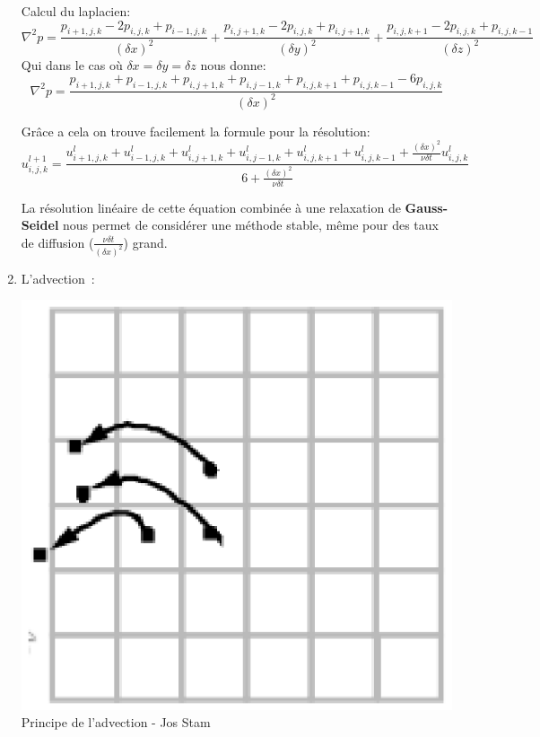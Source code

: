 \documentclass[a4paper,10pt]{article}
\begin{document}
\begin{enumerate}
  Calcul du laplacien:
  \begin{equation}
    {\nabla^2}p = \frac{p_{i+1,j,k} - 2p_{i,j,k} + p_{i-1,j,k} }{({\delta x})^2} + \frac{p_{i,j+1,k} - 2p_{i,j,k} + p_{i,j+1,k}}{({\delta y})^2} + \frac{p_{i,j,k+1} - 2p_{i,j,k} + p_{i,j,k-1}}{({\delta z})^2} 
  \end{equation}
  Qui dans le cas où $\delta x = \delta y =\delta z$ nous donne:
  \begin{equation}
    {\nabla^2}p = \frac{p_{i+1,j,k} + p_{i-1,j,k} + p_{i,j+1,k} + p_{i,j-1,k} + p_{i,j,k+1} + p_{i,j,k-1} - 6p_{i,j,k} }{({\delta x})^2} 
  \end{equation}
  
  Grâce a cela on trouve facilement la formule pour la résolution:
  \begin{equation}
    u_{i,j,k}^{l+1} = \frac{u_{i+1,j,k}^{l} + 
      u_{i-1,j,k}^{l} + 
      u_{i,j+1,k}^{l} +
      u_{i,j-1,k}^{l} + 
      u_{i,j,k+1}^{l} + 
      u_{i,j,k-1}^{l} + 
      \frac{({\delta x})^2}{\nu \delta t} u_{i,j,k}^{l}}{ 6 + \frac{({\delta x})^2}{\nu \delta t}} 
  \end{equation}
  
  La résolution linéaire de cette équation combinée à une relaxation de
  \textbf{Gauss-Seidel} nous permet de considérer une méthode stable, même pour
  des taux de diffusion ($ \frac{\nu \delta t}{({\delta x})^2}$)
  grand.\\
  
  \item{L'advection~:}\\ 
    \begin{center}
	\includegraphics[scale=0.5]{STAM2.ps}\\
	Principe de l'advection - Jos Stam
    \end{center}
  

\end{enumerate}
\end{document}
